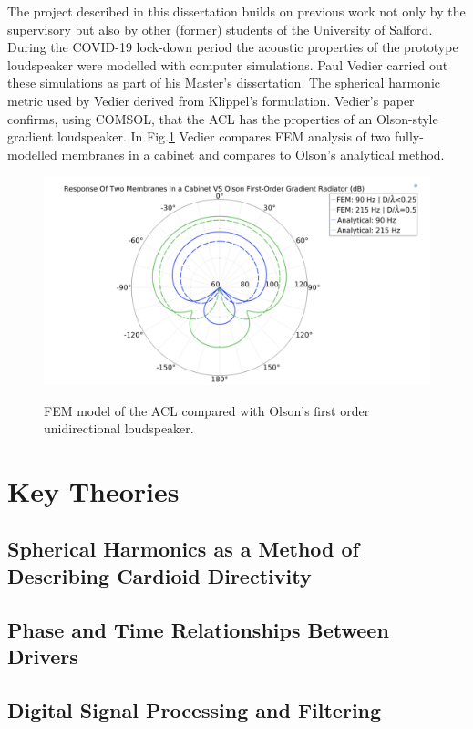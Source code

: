 \documentclass{report}
\begin{document}
        The project described in this dissertation builds on previous work not only by the supervisory but also by other (former) students of the University of Salford.
        During the COVID-19 lock-down period the acoustic properties of the prototype loudspeaker were modelled with computer simulations.
        Paul Vedier carried out these simulations as part of his Master's dissertation.
        The spherical harmonic metric used by Vedier derived from Klippel's formulation.
        Vedier's paper confirms, using COMSOL, that the ACL has the properties of an Olson-style gradient loudspeaker.
        In Fig.\ref{vedierPolar} Vedier compares FEM analysis of two fully-modelled membranes in a cabinet and compares to Olson's analytical method.
        \begin{figure}[H]
            \centering
            \includegraphics[scale=0.5]{figs/vedierPolar.png}
            \caption{FEM model of the ACL compared with Olson's first order unidirectional loudspeaker.}\cite{vedier}
            \label{vedierPolar}
        \end{figure}

\chapter{Key Theories}
    \section{Spherical Harmonics as a Method of Describing Cardioid Directivity}
    \section{Phase and Time Relationships Between Drivers}
    \section{Digital Signal Processing and Filtering}
\end{document}
